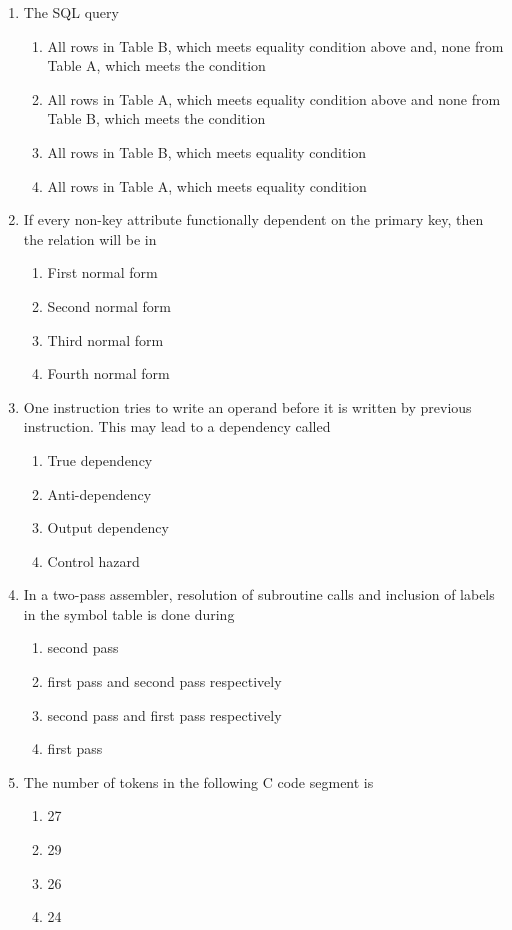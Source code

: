 \documentclass[12pt]{article}
\begin{document}
\begin{enumerate}
\item[36.] The SQL query
\begin{enumerate}[label=\Alph*.]
  \item All rows in Table B, which meets equality condition above and, none from Table A, which meets the condition
  \item All rows in Table A, which meets equality condition above and none from Table B, which meets the condition
  \item All rows in Table B, which meets equality condition
  \item All rows in Table A, which meets equality condition
\end{enumerate}

\item[37.] If every non-key attribute functionally dependent on the primary key, then the relation will be in
\begin{enumerate}[label=\Alph*.]
  \item First normal form
  \item Second normal form
  \item Third normal form
  \item Fourth normal form
\end{enumerate}

\item[38.] One instruction tries to write an operand before it is written by previous instruction. This may lead to a dependency called
\begin{enumerate}[label=\Alph*.]
  \item True dependency
  \item Anti-dependency
  \item Output dependency
  \item Control hazard
\end{enumerate}

\item[39.] In a two-pass assembler, resolution of subroutine calls and inclusion of labels in the symbol table is done during
\begin{enumerate}[label=\Alph*.]
  \item second pass
  \item first pass and second pass respectively
  \item second pass and first pass respectively
  \item first pass
\end{enumerate}

\item[40.] The number of tokens in the following C code segment is
\begin{enumerate}[label=\Alph*.]
  \item 27
  \item 29
  \item 26
  \item 24
\end{enumerate}


\end{enumerate}
\end{document}
